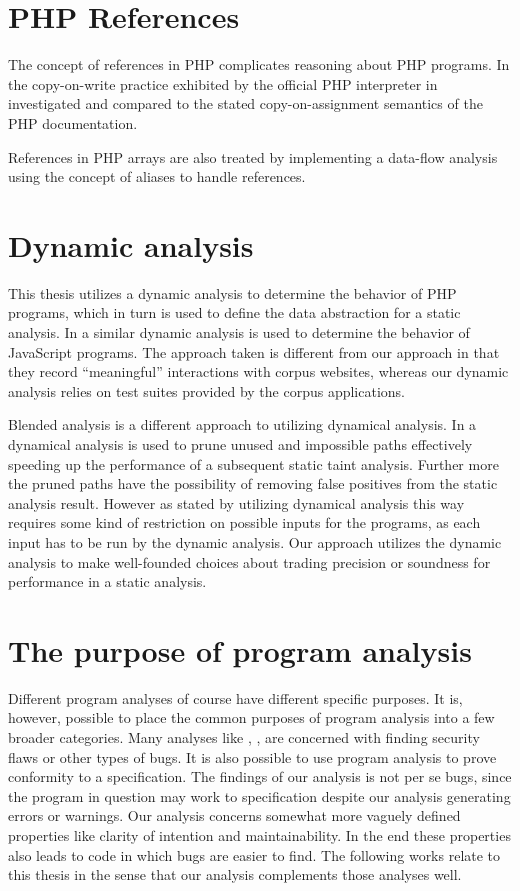 \section{PHP References}
The concept of references in PHP complicates reasoning about PHP programs. In  the copy-on-write practice exhibited by the official PHP interpreter in investigated and compared to the stated copy-on-assignment semantics of the PHP documentation.

References in PHP arrays are also treated by  implementing a data-flow analysis using the concept of aliases to handle references. 

\section{Dynamic analysis}
This thesis utilizes a dynamic analysis to determine the behavior of PHP programs, which in turn is used to define the data abstraction for a static analysis. In  a similar dynamic analysis is used to determine the behavior of JavaScript programs. The approach taken is different from our approach in that they record ``meaningful'' interactions with corpus websites, whereas our dynamic analysis relies on test suites provided by the corpus applications. 

Blended analysis is a different approach to utilizing dynamical analysis. In  a dynamical analysis is used to prune unused and impossible paths effectively speeding up the performance of a subsequent static taint analysis. Further more the pruned paths have the possibility of removing false positives from the static analysis result. However as stated by  utilizing dynamical analysis this way requires some kind of restriction on possible inputs for the programs, as each input has to be run by the dynamic analysis. Our approach utilizes the dynamic analysis to make well-founded choices about trading precision or soundness for performance in a static analysis.

\section{The purpose of program analysis}
Different program analyses of course have different specific purposes. It is, however, possible to place the common purposes of program analysis into a few broader categories. Many analyses like , , are concerned with finding security flaws or other types of bugs. It is also possible to use program analysis to prove conformity to a specification. The findings of our analysis is not per se bugs, since the program in question may work to specification despite our analysis generating errors or warnings. Our analysis concerns somewhat more vaguely defined properties like clarity of intention and maintainability. In the end these properties also leads to code in which bugs are easier to find. The following works relate to this thesis in the sense that our analysis complements those analyses well.

